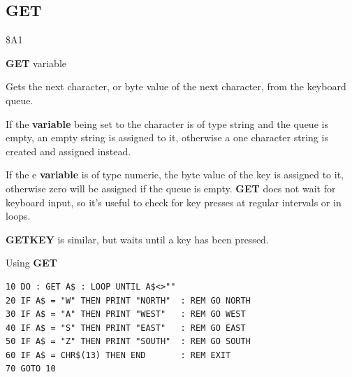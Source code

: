 \subsection{GET}
\begin{description}[leftmargin=2cm,style=nextline]
\item [Token:]    \$A1

\item [Format:]   {\bf GET} variable

\item [Usage:]    Gets the next character, or byte value of the next character, from the keyboard queue.

                  If the {\bf variable} being set to the character is of type string and the queue is empty, an empty string is assigned to it, otherwise a one character string is created and assigned instead.
               
                  If the e {\bf variable} is of type numeric, the byte value of the key is assigned to it, otherwise zero will be assigned if the queue is empty. {\bf GET} does not wait for keyboard input, so it's useful to check for key presses at regular intervals or in loops.

\item [Remarks:]  {\bf GETKEY} is similar, but waits until a key has been pressed.

\item [Example:]  Using {\bf GET}

\begin{tcolorbox}[colback=black,coltext=white]
\verbatimfont{\codefont}
\begin{verbatim}
10 DO : GET A$ : LOOP UNTIL A$<>""
20 IF A$ = "W" THEN PRINT "NORTH"  : REM GO NORTH
30 IF A$ = "A" THEN PRINT "WEST"   : REM GO WEST
40 IF A$ = "S" THEN PRINT "EAST"   : REM GO EAST
50 IF A$ = "Z" THEN PRINT "SOUTH"  : REM GO SOUTH
60 IF A$ = CHR$(13) THEN END       : REM EXIT
70 GOTO 10
\end{verbatim}
\end{tcolorbox}
\end{description}


\newpage
